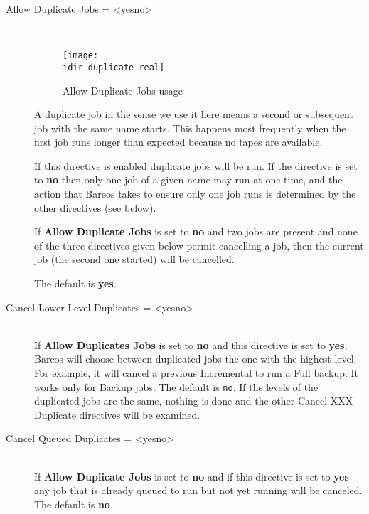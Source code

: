 \begin{description}
\item [Allow Duplicate Jobs = {\textless}yes{\textbar}no{\textgreater}] \hfill \\
\begin{figure}[htbp]
  \centering
  \texttt{[image: \\idir duplicate-real]}
  \caption{Allow Duplicate Jobs usage}
  \label{fig:allowduplicatejobs}
\end{figure}
A duplicate job in the sense we use it here means a second or subsequent job
with the same name starts.  This happens most frequently when the first job
runs longer than expected because no tapes are available.

If this directive is enabled duplicate jobs will be run.  If
the directive is set to {\bf no} then only one job of a given name
may run at one time, and the action that Bareos takes to ensure only
one job runs is determined by the other directives (see below).

If {\bf Allow Duplicate Jobs} is set to {\bf no} and two jobs
are present and none of the three directives given below permit
cancelling a job, then the current job (the second one started)
will be cancelled.

The default is {\bf yes}.


\item [Cancel Lower Level Duplicates = {\textless}yes{\textbar}no{\textgreater}] \hfill \\
If \textbf{Allow Duplicates Jobs} is set to \textbf{no} and this
directive is set to \textbf{yes}, Bareos will choose between duplicated
jobs the one with the highest level.  For example, it will cancel a
previous Incremental to run a Full backup.  It works only for Backup
jobs.  The default is \texttt{no}. If the levels of the duplicated
jobs are the same, nothing is done and the other
Cancel XXX Duplicate directives will be examined.

\item [Cancel Queued Duplicates = {\textless}yes{\textbar}no{\textgreater}] \hfill \\
If {\bf Allow Duplicate Jobs} is set to {\bf no} and
if this directive is set to {\bf yes} any job that is
already queued to run but not yet running will be canceled.
The default is {\bf no}.


\end{description}
